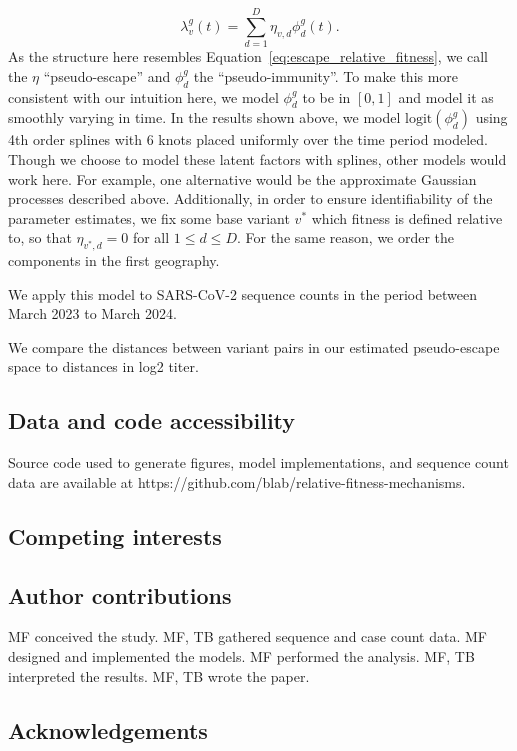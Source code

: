 \documentclass[12pt,oneside,letterpaper]{article}
\begin{document}
\begin{equation}
    \lambda_{v}^{g}(t) = \sum_{d=1}^{D} \eta_{v,d} \phi_{d}^{g}(t).
\end{equation}
As the structure here resembles Equation~\ref{eq:escape_relative_fitness}, we call the $\eta$ ``pseudo-escape'' and $\phi_{d}^{g}$ the ``pseudo-immunity''.
To make this more consistent with our intuition here, we model $\phi_{d}^{g}$ to be in $[0,1]$ and model it as smoothly varying in time.
In the results shown above, we model $\text{logit}(\phi_{d}^{g})$ using 4th order splines with 6 knots placed uniformly over the time period modeled.
Though we choose to model these latent factors with splines, other models would work here. 
For example, one alternative would be the approximate Gaussian processes described above.
Additionally, in order to ensure identifiability of the parameter estimates, we fix some base variant $v^*$ which fitness is defined relative to, so that $\eta_{v^*, d} = 0$ for all $1\leq d\leq D$.
For the same reason, we order the components in the first geography.

We apply this model to SARS-CoV-2 sequence counts in the period between March 2023 to March 2024.

We compare the distances between variant pairs in our estimated pseudo-escape space to distances in log2 titer.

\subsection*{Data and code accessibility}

Source code used to generate figures, model implementations, and sequence count data are available at https://github.com/blab/relative-fitness-mechanisms.

\subsection*{Competing interests}%

\subsection*{Author contributions}
MF conceived the study.
MF, TB gathered sequence and case count data.
MF designed and implemented the models.
MF performed the analysis.
MF, TB interpreted the results.
MF, TB wrote the paper.


\subsection*{Acknowledgements}%
\end{document}
